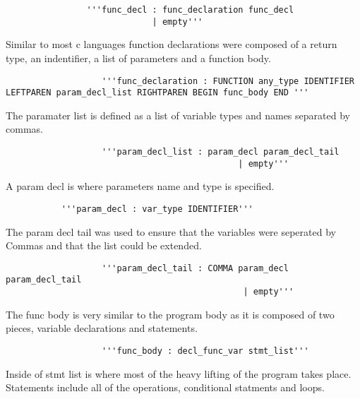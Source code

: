 \documentclass[12pt]{article}
\begin{document}
           \begin{verbatim}
           		'''func_decl : func_declaration func_decl
               	             | empty'''
            \end{verbatim}
            
            Similar to most c languages function declarations were composed of a return type, an indentifier, a list of parameters and a function body.
            
            \begin{verbatim}
                   '''func_declaration : FUNCTION any_type IDENTIFIER LEFTPAREN param_decl_list RIGHTPAREN BEGIN func_body END '''
           \end{verbatim}
           
           The paramater list is defined as a list of variable types and names separated by commas.
           
            \begin{verbatim}
                   '''param_decl_list : param_decl param_decl_tail
                                              | empty'''
           \end{verbatim}
           
			A param decl is where parameters name and type is specified.
			
			\begin{verbatim}
           '''param_decl : var_type IDENTIFIER'''
           \end{verbatim}
			            
           The param decl tail was used to ensure that the variables were seperated by Commas and that the list could be extended.
           
           \begin{verbatim}
                   '''param_decl_tail : COMMA param_decl param_decl_tail
					                           | empty'''
           \end{verbatim}
           
           The func body is very similar to the program body as it is composed of two pieces, variable declarations and statements.
           
           \begin{verbatim}
                   '''func_body : decl_func_var stmt_list'''
           \end{verbatim}
           
           Inside of stmt list is where most of the heavy lifting of the program takes place.  Statements include all of the operations, conditional statments and loops.
           
\end{document}
